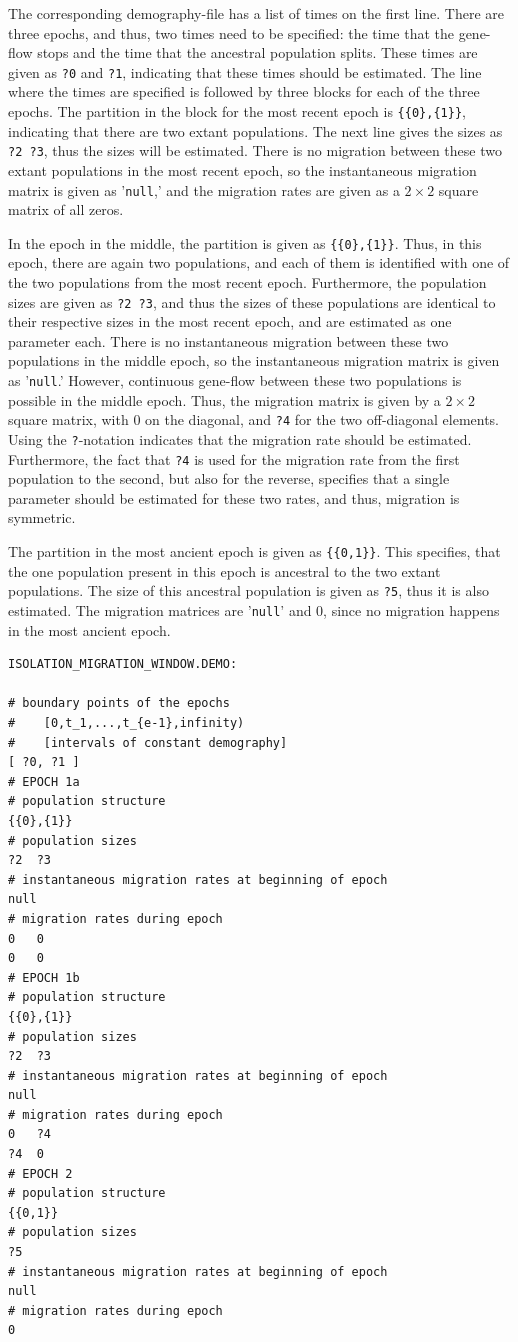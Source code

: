\documentclass{article}
\numberwithin{equation}{section}
\begin{document}
The corresponding demography-file has a list of times on the first line. There are three epochs, and thus, two times need to be specified:  the time that the gene-flow stops and the time that the ancestral population splits. These times are given as \texttt{?0} and \texttt{?1}, indicating that these times should be estimated. The line where the times are specified is followed by three blocks for each of the three epochs. The partition in the block for the most recent epoch is \texttt{\{\{0\},\{1\}\}}, indicating that there are two extant populations. The next line gives the sizes as \texttt{?2 ?3}, thus the sizes will be estimated. There is no migration between these two extant populations in the most recent epoch, so the instantaneous migration matrix is given as '\texttt{null},' and the migration rates are given as a $2 \times 2$ square matrix of all zeros.

In the epoch in the middle, the partition is given as \texttt{\{\{0\},\{1\}\}}. Thus, in this epoch, there are again two populations, and each of them is identified with one of the two populations from the most recent epoch. Furthermore, the population sizes are given as \texttt{?2 ?3}, and thus the sizes of these populations are identical to their respective sizes in the most recent epoch, and are estimated as one parameter each. There is no instantaneous migration between these two populations in the middle epoch, so the instantaneous migration matrix is given as '\texttt{null}.' However, continuous gene-flow between these two populations is possible in the middle epoch. Thus, the migration matrix is given by a $2 \times 2$ square matrix, with 0 on the diagonal, and \texttt{?4} for the two off-diagonal elements. Using the \texttt{?}-notation indicates that the migration rate should be estimated. Furthermore, the fact that \texttt{?4} is used for the migration rate from the first population to the second, but also for the reverse, specifies that a single parameter should be estimated for these two rates, and thus, migration is symmetric.

The partition in the most ancient epoch is given as \texttt{\{\{0,1\}\}}. This specifies, that the one population present in this epoch is ancestral to the two extant populations. The size of this ancestral population is given as \texttt{?5}, thus it is also estimated. The migration matrices are '\texttt{null}' and 0, since no migration happens in the most ancient epoch.

\begin{verbatim}
ISOLATION_MIGRATION_WINDOW.DEMO:

# boundary points of the epochs
#    [0,t_1,...,t_{e-1},infinity)
#    [intervals of constant demography]
[ ?0, ?1 ]
# EPOCH 1a
# population structure
{{0},{1}}
# population sizes
?2	?3
# instantaneous migration rates at beginning of epoch
null
# migration rates during epoch
0	0
0	0
# EPOCH 1b
# population structure
{{0},{1}}
# population sizes
?2	?3
# instantaneous migration rates at beginning of epoch
null
# migration rates during epoch
0	?4
?4	0
# EPOCH 2
# population structure
{{0,1}}
# population sizes
?5
# instantaneous migration rates at beginning of epoch
null
# migration rates during epoch
0
\end{verbatim}
\end{document}
